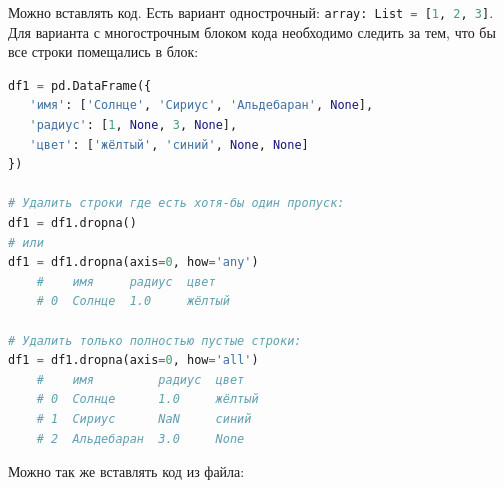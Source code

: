 \documentclass[a4paper, 14pt]{extreport}
\begin{document}
\newpage
Можно вставлять код. Есть вариант однострочный: \lstinline[language=Python]{array: List = [1, 2, 3]}. Для варианта с многострочным блоком кода необходимо следить за тем, что бы все строки помещались в блок:
\begin{lstlisting}[language=Python]
df1 = pd.DataFrame({
   'имя': ['Солнце', 'Сириус', 'Альдебаран', None],
   'радиус': [1, None, 3, None],
   'цвет': ['жёлтый', 'синий', None, None]
})
   
# Удалить строки где есть хотя-бы один пропуск:
df1 = df1.dropna()
# или
df1 = df1.dropna(axis=0, how='any')
    #    имя     радиус  цвет
    # 0  Солнце  1.0     жёлтый

# Удалить только полностью пустые строки:
df1 = df1.dropna(axis=0, how='all')
    #    имя         радиус  цвет
    # 0  Солнце      1.0     жёлтый
    # 1  Сириус      NaN     синий
    # 2  Альдебаран  3.0     None
\end{lstlisting}

Можно так же вставлять код из файла:

\end{document}

